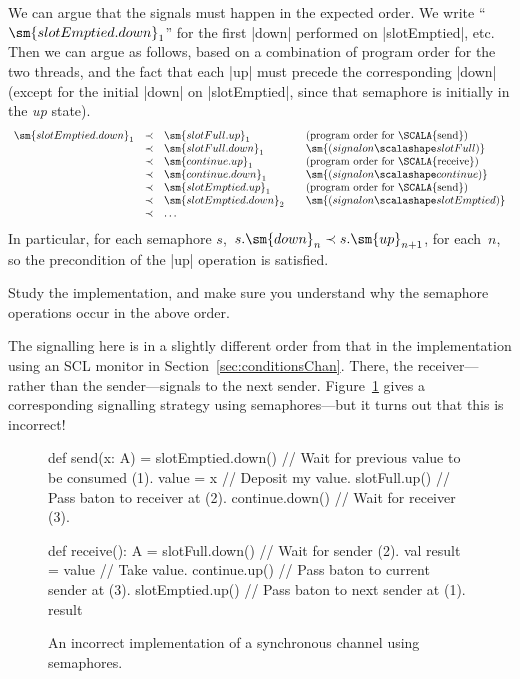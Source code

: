 We can argue that the signals must happen in the expected order.  We write
``$\sm{slotEmptied.down}_1$'' for the first |down| performed on |slotEmptied|,
etc.  Then we can argue as follows, based on a combination of program order
for the two threads, and the fact that each |up| must precede the
corresponding |down| (except for the initial |down| on |slotEmptied|, since
that semaphore is initially in the \emph{up} state).  
\[
\begin{array}{rcl@{\qquad}l}
\sm{slotEmptied.down}_1 & \prec & \sm{slotFull.up}_1 & 
  \mbox{(program order for \SCALA{send})} \\
  & \prec & \sm{slotFull.down}_1 & \sm{(signal on {\scalashape slotFull})} \\
  & \prec & \sm{continue.up}_1 & \mbox{(program order for \SCALA{receive})} \\
  & \prec & \sm{continue.down}_1 & \sm{(signal on {\scalashape continue})} \\
  & \prec & \sm{slotEmptied.up}_1 & \mbox{(program order for \SCALA{send})} \\
  & \prec & \sm{slotEmptied.down}_2 & 
     \sm{(signal on {\scalashape slotEmptied})} \\
  & \prec & \ldots
\end{array}
\]
In particular, for each semaphore $s$,\, $s.\sm{down}_n \prec
s.\sm{up}_{n+1}$, for each~$n$, so the precondition of the |up| operation is
satisfied.

\begin{instruction}
Study the implementation, and make sure you understand why the semaphore
operations occur in the above order.
\end{instruction}


The signalling here is in a slightly different order from that in the
implementation using an SCL monitor in Section~\ref{sec:conditionsChan}.
There, the receiver---rather than the sender---signals to the next sender.
Figure~\ref{fig:SemaphoreSyncChan-incorrect} gives a corresponding signalling
strategy using semaphores---but it turns out that this is incorrect!


\begin{figure}
\begin{scala}
  def send(x: A) = {
    slotEmptied.down()       // Wait for previous value to be consumed (1).
    value = x               // Deposit my value.
    slotFull.up()             // Pass baton to receiver at (2).
    continue.down()           // Wait for receiver (3).
  }

  def receive(): A = {
    slotFull.down()           // Wait for sender (2).
    val result = value      // Take value.
    continue.up()             // Pass baton to current sender at (3).
    slotEmptied.up()          // Pass baton to next sender at (1).
    result
  }
\end{scala}
\caption{An incorrect implementation of a synchronous channel using
  semaphores.}
\label{fig:SemaphoreSyncChan-incorrect}
\end{figure}

